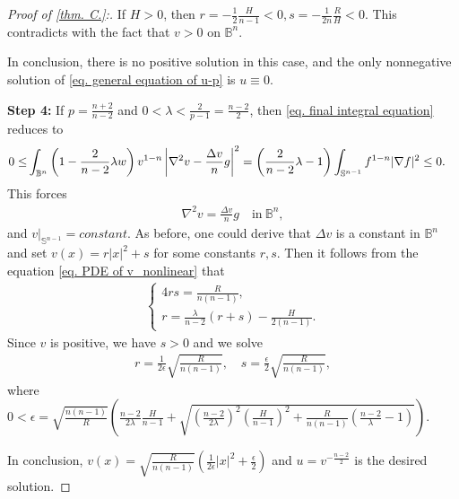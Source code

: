 \documentclass[12pt]{amsart}
\numberwithin{equation}{section}
\numberwithin{lemma}{section}
\numberwithin{proposition}{section}
\numberwithin{corollary}{section}
\numberwithin{remark}{section}
\begin{document}
\begin{proof}[Proof of \cref{thm. C.}:]
If $H>0$, then $r=-\frac{1}{2}\frac{H}{n-1}<0, s=-\frac{1}{2n}\frac{R}{H}<0$. This contradicts with the fact that $v>0$ on $\mathbb{B}^n$.

In conclusion, there is no positive solution in this case, and the only nonnegative solution of \cref{eq. general equation of u-p} is $u\equiv 0$.

\textbf{Step 4:} If $p=\frac{n+2}{n-2}$ and  $0<\lambda< \frac{2}{p-1}=\frac{n-2}{2}$, then \cref{eq. final integral equation} reduces to
\begin{align*}
    0\leq&\int_{\mathbb{B}^n}
    \left(1-\frac{2}{n-2}\lambda w\right)
    v^{1-n}
        \left|\nabla^2 v-\frac{\Delta v}{n}g\right|^2
        \notag
        =\left(\frac{2}{n-2}\lambda-1\right)
        \int_{\mathbb{S}^{n-1}}f^{1-n}|\nabla f|^2\leq 0.
\end{align*}
This forces
\begin{align*}
    \nabla^2v=\frac{\Delta v}{n}g \quad\mathrm{in} \ \mathbb{B}^n,
\end{align*}
and $v|_{\mathbb{S}^{n-1}}=constant$. As before, one could derive that $\Delta v$ is a constant in $\mathbb{B}^n$ and set $v(x)=r|x|^2+s$ for some constants $r,s$. Then it follows from the equation \cref{eq. PDE of v_nonlinear} that
\begin{align*}
    \begin{cases}
        4rs=\frac{R}{n(n-1)},\\
        r=\frac{\lambda}{n-2}(r+s)-\frac{H}{2(n-1)}.
    \end{cases}
\end{align*}
Since $v$ is positive, we have $s>0$ and we solve
\begin{align*}
    r=\frac{1}{2\epsilon}\sqrt{\frac{R}{n(n-1)}},\quad 
    s=\frac{\epsilon}{2}\sqrt{\frac{R}{n(n-1)}},
\end{align*}
where $0<\epsilon=\sqrt{\frac{n(n-1)}{R}}
            \left(
        \frac{n-2}{2\lambda}\frac{H}{n-1}+\sqrt{(\frac{n-2}{2\lambda})^2(\frac{H}{n-1})^2+\frac{R}{n(n-1)}(\frac{n-2}{\lambda}-1)}
            \right)$.

In conclusion, $v(x)=\sqrt{\frac{R}{n(n-1)}}
\left(\frac{1}{2\epsilon}|x|^2+\frac{\epsilon}{2}\right)$ and $u=v^{-\frac{n-2}{2}}$ is the desired solution.


\end{proof}
\end{document}
